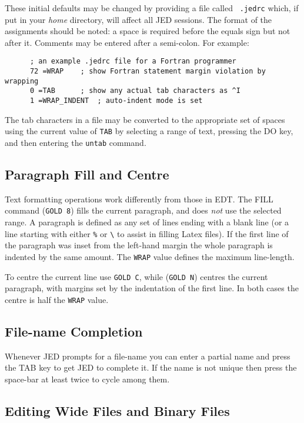 These initial defaults may be changed by providing a file called {\tt
.jedrc} which, if put in your {\em home} directory, will affect all JED
sessions.  The format of the assignments should be noted: a space is
required before the equals sign but not after it. Comments may be entered
after a semi-colon.  For example:

\begin{verbatim}
      ; an example .jedrc file for a Fortran programmer
      72 =WRAP    ; show Fortran statement margin violation by wrapping
      0 =TAB      ; show any actual tab characters as ^I
      1 =WRAP_INDENT  ; auto-indent mode is set
\end{verbatim}

The tab characters in a file may be converted to the appropriate set of
spaces using the current value of {\tt TAB} by selecting a range of text,
pressing the DO key, and then entering the {\tt untab} command.

\subsection{Paragraph Fill and Centre}

Text formatting operations work differently from those in EDT. The FILL
command ({\tt GOLD 8}) fills the current paragraph, and does {\em not}
use the selected range.  A paragraph is defined as any set of lines
ending with a blank line (or a line starting with either {\tt \%} or 
\verb+\+ to assist in filling Latex files). If the
first line of the paragraph was inset from the left-hand margin the whole
paragraph is indented by the same amount.  The {\tt WRAP} value defines
the maximum line-length.

To centre the current line use {\tt GOLD C}, while ({\tt GOLD N}) centres
the current paragraph, with margins set by the indentation of the first
line.  In both cases the centre is half the {\tt WRAP} value.

\subsection{File-name Completion}

Whenever JED prompts for a file-name you can enter a partial name and
press the TAB key to get JED to complete it.  If the name is not unique
then press the space-bar at least twice to cycle among them.

\subsection{Editing Wide Files and Binary Files}

